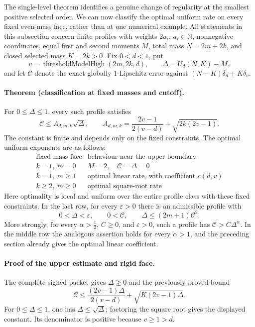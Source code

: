 The single-level theorem identifies a genuine change of regularity at the
smallest positive selected order.  We can now classify the optimal uniform
rate on every fixed even-mass face, rather than at one numerical example.
All statements in this subsection concern finite profiles with weights
\(2a_i\), \(a_i\in\mathbb N\), nonnegative coordinates, equal first and
second moments \(M\), total mass \(N=2m+2k\), and closed selected mass
\(K=2k>0\).  Fix \(0<d<1\), put
\[
 v=\operatorname{thresholdModelHigh}(2m,2k,d),\qquad
 \Delta=U_d(N,K)-M,
\]
and let \(\mathcal C\) denote the exact globally \(1\)-Lipschitz error
against \((N-K)\delta_d+K\delta_v\).

\paragraph{Theorem (classification at fixed masses and cutoff).}
For \(0\leq\Delta\leq1\), every such profile satisfies
\[
 \mathcal C\leq
 A_{d,m,k}\sqrt{\Delta},\qquad
 A_{d,m,k}=\frac{2v-1}{2(v-d)}+\sqrt{2k(2v-1)}.
\]
The constant is finite and depends only on the fixed constraints.
The optimal uniform exponents are as follows:
\[
\begin{array}{c|c}
 \text{fixed mass face}&\text{behaviour near the upper boundary}\\ \hline
 k=1,\ m=0& M=2,\quad \mathcal C=\Delta=0\\
 k=1,\ m\geq1&\text{optimal linear rate, with coefficient }c(d,v)\\
 k\geq2,\ m\geq0&\text{optimal square-root rate}
\end{array}
\]
Here optimality is local and uniform over the entire profile class with
these fixed constraints.  In the last row, for every \(\varepsilon>0\)
there is an admissible profile with
\begin{equation}
 0<\Delta<\varepsilon,\qquad
 0<\mathcal C,\qquad
 \Delta\leq(2m+1)\mathcal C^2.
 \label{eq:even-threshold-rate-lower}
\end{equation}
More strongly, for every \(\alpha>\tfrac12\), \(C\geq0\), and
\(\varepsilon>0\), such a profile has
\(\mathcal C>C\Delta^\alpha\).
In the middle row the analogous assertion holds for every
\(\alpha>1\), and the preceding section already gives the optimal
linear coefficient.

\paragraph{Proof of the upper estimate and rigid face.}
The complete signed packet gives \(\Delta\geq0\) and the previously
proved bound
\[
 \mathcal C\leq
 \frac{(2v-1)\Delta}{2(v-d)}
       +\sqrt{K(2v-1)\Delta}.
\]
For \(0\leq\Delta\leq1\), one has \(\Delta\leq\sqrt{\Delta}\);
factoring the square root gives the displayed constant.
Its denominator is positive because \(v\geq1>d\).

